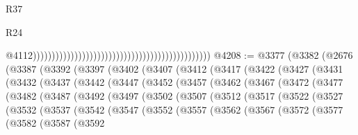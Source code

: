 \begin{lexlean}{R37}
\begin{lexlean}{R24}
\begin{coremodule}
{{{{{{{{{{{{{{{{{{{{{{{{{{{{{{{{{{{{{{{{{{{{{{{{{{{{{{{{{{{{{{{{{{{{{{{{{{{{{{{{{{{{{{{{{{{{{{{{{{{{{{{{{{{{{{{{{{{{{{{{{{{{{{{{{{{{{{{{{{{{{{{{{{{{{{{{{{{{{{{{{{{{{{{{{{{{{{{{{{{{{{{{{                                                                                                  @4112)))))))))))))))))))))))))))))))))))))))))))))))
@4208 := @3377
    (@3382
      (@2676
        (@3387
          (@3392
            (@3397
              (@3402
                (@3407
                  (@3412
                    (@3417
                      (@3422
                        (@3427
                          (@3431
                            (@3432
                              (@3437
                                (@3442
                                  (@3447
                                    (@3452
                                      (@3457
                                        (@3462
                                          (@3467
                                            (@3472
                                              (@3477
                                                (@3482
                                                  (@3487
                                                    (@3492
                                                      (@3497
                                                        (@3502
                                                          (@3507
                                                            (@3512
                                                              (@3517
                                                                (@3522
                                                                  (@3527
                                                                    (@3532
                                                                      (@3537
                                                                        (@3542
                                                                          (@3547
                                                                            (@3552
                                                                              (@3557
                                                                                (@3562
                                                                                  (@3567
                                                                                    (@3572
                                                                                      (@3577
                                                                                        (@3582
                                                                                          (@3587
                                                                                            (@3592
}}}}}}}}}}}}}}}}}}}}}}}}}}}}}}}}}}}}}}}}}}}}}}}}}}}}}}}}}}}}}}}}}}}}}}}}}}}}}}}}}}}}}}}}}}}}}}}}}}}}}}}}}}}}}}}}}}}}}}}}}}}}}}}}}}}}}}}}}}}}}}}}}}}}}}}}}}}}}}}}}}}}}}}}}}}}}}}}}}}}}}}}}
\end{coremodule}
\end{lexlean}
\end{lexlean}
